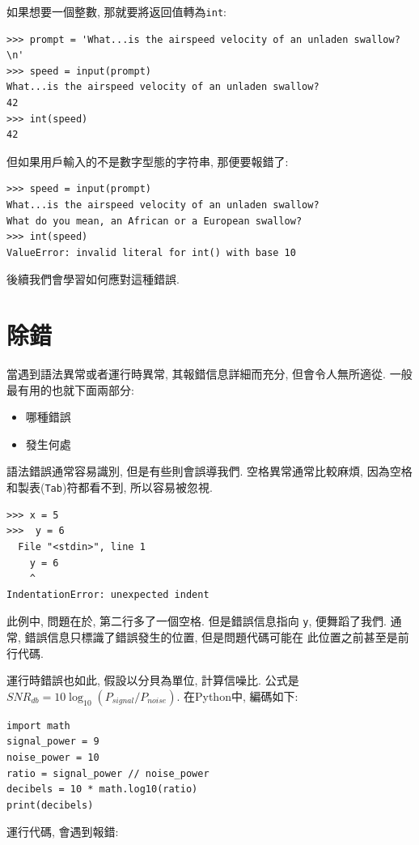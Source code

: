 \documentclass[10pt]{book}
\begin{document}
如果想要一個整數, 那就要將返回值轉為{\tt int}:

\begin{verbatim}
>>> prompt = 'What...is the airspeed velocity of an unladen swallow?\n'
>>> speed = input(prompt)
What...is the airspeed velocity of an unladen swallow?
42
>>> int(speed)
42
\end{verbatim}
%
但如果用戶輸入的不是數字型態的字符串, 那便要報錯了:

\begin{verbatim}
>>> speed = input(prompt)
What...is the airspeed velocity of an unladen swallow?
What do you mean, an African or a European swallow?
>>> int(speed)
ValueError: invalid literal for int() with base 10
\end{verbatim}
%
後續我們會學習如何應對這種錯誤. 


\section{除錯}
\label{whitespace}

當遇到語法異常或者運行時異常, 其報錯信息詳細而充分, 
但會令人無所適從. 一般最有用的也就下面兩部分:

\begin{itemize}

\item 哪種錯誤

\item 發生何處

\end{itemize}

語法錯誤通常容易識別, 但是有些則會誤導我們. 
空格異常通常比較麻煩, 因為空格和製表({\tt Tab})符都看不到, 所以容易被忽視. 

\begin{verbatim}
>>> x = 5
>>>  y = 6
  File "<stdin>", line 1
    y = 6
    ^
IndentationError: unexpected indent
\end{verbatim}
%
此例中, 問題在於, 第二行多了一個空格. 
但是錯誤信息指向 {\tt y}, 便舞蹈了我們. 
通常, 錯誤信息只標識了錯誤發生的位置, 但是問題代碼可能在
此位置之前甚至是前行代碼. 

運行時錯誤也如此, 假設以分貝為單位, 計算信噪比. 
公式是$SNR_{db} = 10 \log_{10} (P_{signal} / P_{noise})$. 
在Python中, 編碼如下:

\begin{verbatim}
import math
signal_power = 9
noise_power = 10
ratio = signal_power // noise_power
decibels = 10 * math.log10(ratio)
print(decibels)
\end{verbatim}
%
運行代碼, 會遇到報錯:
%
\end{document}
